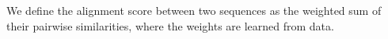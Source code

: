 We define the alignment score between two sequences as the weighted sum of their pairwise similarities, where the weights are learned from data.
